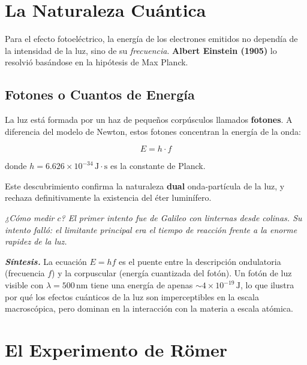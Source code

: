 \documentclass[12pt, a4paper]{article}
\theoremstyle{definition}
\newcommand{\nota}[1]{\medskip\noindent\colorbox{grisclaro}{\parbox{0.95\linewidth}{\textit{#1}}}\medskip}
\begin{document}
\section{La Naturaleza Cuántica}
\label{sec:naturaleza_cuantica}

Para el efecto fotoeléctrico, la energía de los electrones emitidos no dependía de la
intensidad de la luz, sino de su \textit{frecuencia}. \textbf{Albert Einstein (1905)} lo
resolvió basándose en la hipótesis de Max Planck.

\subsection{Fotones o Cuantos de Energía}

La luz está formada por un haz de pequeños corpúsculos llamados \textbf{fotones}. A diferencia
del modelo de Newton, estos fotones concentran la energía de la onda:

\begin{equation}
  E = h \cdot f
  \label{eq:energia_foton}
\end{equation}

donde \(h = 6.626 \times 10^{-34}\,\text{J}\cdot\text{s}\) es la constante de Planck.

Este descubrimiento confirma la naturaleza \textbf{dual} onda-partícula de la luz, y rechaza
definitivamente la existencia del éter luminífero.

\nota{¿Cómo medir \(c\)? El primer intento fue de Galileo con linternas desde colinas. Su
intento falló: el limitante principal era el tiempo de reacción frente a la enorme rapidez
de la luz.}

\textit{\textbf{Síntesis.}} La ecuación \(E = hf\) es el puente entre la descripción
ondulatoria (frecuencia \(f\)) y la corpuscular (energía cuantizada del fotón). Un fotón de
luz visible con \(\lambda = 500\,\text{nm}\) tiene una energía de apenas
\(\sim 4 \times 10^{-19}\,\text{J}\), lo que ilustra por qué los efectos cuánticos de la luz
son imperceptibles en la escala macroscópica, pero dominan en la interacción con la materia a
escala atómica.

\section{El Experimento de Römer}
\label{sec:romer}
\end{document}
